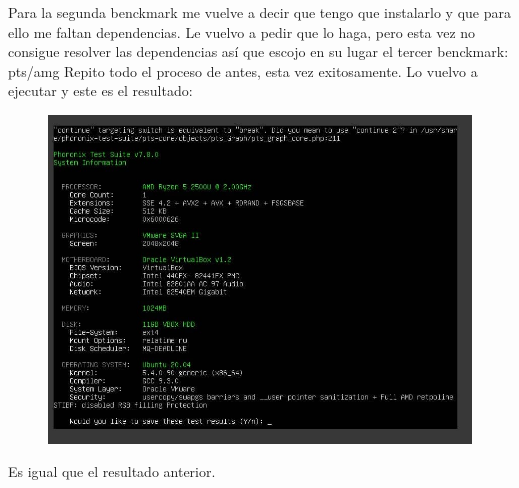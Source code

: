 Para la segunda benckmark me vuelve a decir que tengo que instalarlo y que para ello me faltan dependencias. Le vuelvo a pedir que lo haga, pero esta vez no consigue resolver las dependencias así que escojo en su lugar el tercer benckmark: pts/amg 
Repito todo el proceso de antes, esta vez exitosamente. Lo vuelvo a ejecutar y este es el resultado: 
\begin{figure}[H]
\centering
\includegraphics{resultado3.jpg}
\end{figure}
Es igual que el resultado anterior. 

